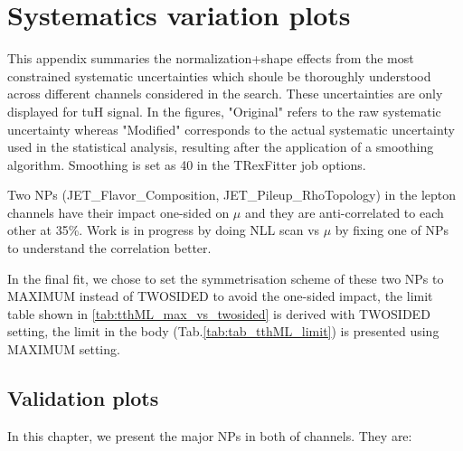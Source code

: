 \section{Systematics variation plots}
\label{sec:sys_variation}


This appendix summaries the normalization+shape effects from the most constrained systematic uncertainties which shoule be thoroughly understood across different channels considered in the search. These uncertainties are only displayed for tuH signal. In the figures, "Original" refers to the raw systematic uncertainty whereas "Modified" corresponds to the actual systematic uncertainty used in the statistical analysis, resulting after the application of a smoothing algorithm. Smoothing is set as 40 in the TRexFitter job options.

Two NPs (JET\_Flavor\_Composition, JET\_Pileup\_RhoTopology) in the lepton channels have their impact one-sided on $\mu$ and they are anti-correlated to each other
at 35\%. Work is in progress by doing NLL scan vs $\mu$ by fixing one of NPs to understand the correlation better.

In the final fit, we chose to set the symmetrisation scheme of these two NPs to MAXIMUM instead of TWOSIDED to avoid the one-sided impact, the limit table shown in \ref{tab:tthML_max_vs_twosided} is derived with TWOSIDED setting, the limit in the body (Tab.\ref{tab:tab_tthML_limit}) is presented using MAXIMUM setting.

\subsection{Validation plots}
In this chapter, we present the major NPs in both of channels. They are:

